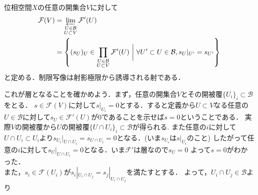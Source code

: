 \documentclass[dvipdfmx,a4paper,11pt]{jsbook}
\begin{document}
{%


位相空間$X$の任意の開集合$V$に対して
\begin{align*}
  \mathcal{F}(V) 
  &= \varprojlim_{\substack{U\in \mathcal{B}\\ U\subset V}}\mathcal{F}'(U)\\
  &= \left\{(s_{U})_{U} \in \prod_{\substack{U\in \mathcal{B}\\ U \subset V}} \mathcal{F}'(U) \ \biggl|\ 
  \forall U' \subset U \in \mathcal{B}, s_{U}|_{U'}=s_{U'} \right\}
\end{align*}
と定める．制限写像は射影極限から誘導される射である．
\begin{center}
\end{center}
これが層となることを確かめよう．まず，任意の開集合$V$とその開被覆$\{U_{i}\}_{i}\subset \mathcal{B}$をとる．
$s\in \mathcal{F}(V)$に対して$s|_{U_{i}}=0$とする．すると定義から$U\subset V$なる任意の$U\in \mathcal{B}$に対して$s_{U}\in \mathcal{F}'(U)$が$0$であることを示せば$s=0$ということである．
実際$V$の開被覆から$U$の開被覆$\{U \cap U_{i}\}_{i}\subset \mathcal{B}$が得られる.
また任意の$i$に対して$U\cap U_{i} \subset U_{i}$より$s_{U_{i}}|_{U\cap U_{i}} = s_{U\cap U_{i}} = 0$となる．(いま$s_{U_{i}}$は$s|_{U_{i}}$のこと)
したがって任意の$i$に対して$s_{U}|_{U\cap U_{i}} = 0$となる．いま$\mathcal{F}'$は層なので$s_{U}=0$
よって$s=0$がわかった．\\
また，$s_{i} \in \mathcal{F}(U_{i})$が$s_{i}|_{U_{i}\cap U_{j}} = s_{j}|_{U_{i} \cap U_{j}}$を満たすとする．
よって，$U_{i}\cap U_{j} \in \mathcal{B}$より
}{}
\end{document}
